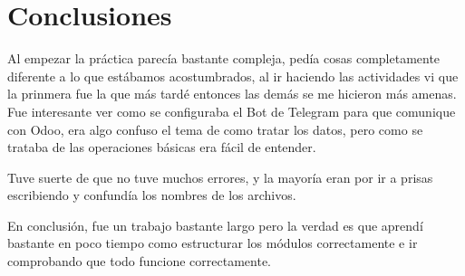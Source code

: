 \documentclass[a4paper,12pt]{article}
\begin{document}
\vspace{8cm}
\section{Conclusiones}

Al empezar la práctica parecía bastante compleja, pedía cosas completamente diferente a lo que estábamos acostumbrados, al ir haciendo las actividades vi que la prinmera fue la que más tardé entonces las demás se me hicieron más amenas. Fue interesante ver como se configuraba el Bot de Telegram para que comunique con Odoo, era algo confuso el tema de como tratar los datos, pero como se trataba de las operaciones básicas era fácil de entender.

Tuve suerte de que no tuve muchos errores, y la mayoría eran por ir a prisas escribiendo y confundía los nombres de los archivos. 

En conclusión, fue un trabajo bastante largo pero la verdad es que aprendí bastante en poco tiempo como estructurar los módulos correctamente e ir comprobando que todo funcione correctamente.
\end{document}
